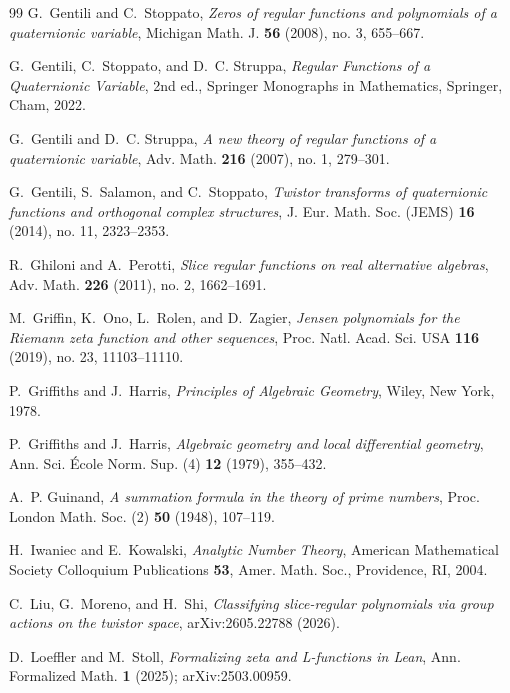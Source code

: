 \documentclass[11pt]{amsart}
\theoremstyle{plain}
\theoremstyle{definition}
\theoremstyle{remark}
\begin{document}
\begin{thebibliography}{99}
G.~Gentili and C.~Stoppato,
\emph{Zeros of regular functions and polynomials of a quaternionic variable},
Michigan Math. J. \textbf{56} (2008), no. 3, 655--667.

G.~Gentili, C.~Stoppato, and D.~C. Struppa,
\emph{Regular Functions of a Quaternionic Variable}, 2nd ed.,
Springer Monographs in Mathematics, Springer, Cham, 2022.

G.~Gentili and D.~C. Struppa,
\emph{A new theory of regular functions of a quaternionic variable},
Adv. Math. \textbf{216} (2007), no. 1, 279--301.

G.~Gentili, S.~Salamon, and C.~Stoppato,
\emph{Twistor transforms of quaternionic functions and orthogonal complex structures},
J. Eur. Math. Soc. (JEMS) \textbf{16} (2014), no. 11, 2323--2353.

R.~Ghiloni and A.~Perotti,
\emph{Slice regular functions on real alternative algebras},
Adv. Math. \textbf{226} (2011), no. 2, 1662--1691.

M.~Griffin, K.~Ono, L.~Rolen, and D.~Zagier,
\emph{Jensen polynomials for the Riemann zeta function and other sequences},
Proc. Natl. Acad. Sci. USA \textbf{116} (2019), no. 23, 11103--11110.

P.~Griffiths and J.~Harris,
\emph{Principles of Algebraic Geometry},
Wiley, New York, 1978.

P.~Griffiths and J.~Harris,
\emph{Algebraic geometry and local differential geometry},
Ann. Sci. \'Ecole Norm. Sup. (4) \textbf{12} (1979), 355--432.

A.~P. Guinand,
\emph{A summation formula in the theory of prime numbers},
Proc. London Math. Soc. (2) \textbf{50} (1948), 107--119.

H.~Iwaniec and E.~Kowalski,
\emph{Analytic Number Theory},
American Mathematical Society Colloquium Publications \textbf{53},
Amer. Math. Soc., Providence, RI, 2004.

C.~Liu, G.~Moreno, and H.~Shi,
\emph{Classifying slice-regular polynomials via group actions on the twistor space},
arXiv:2605.22788 (2026).

D.~Loeffler and M.~Stoll,
\emph{Formalizing zeta and L-functions in Lean},
Ann. Formalized Math. \textbf{1} (2025); arXiv:2503.00959.


\end{thebibliography}
\end{document}

